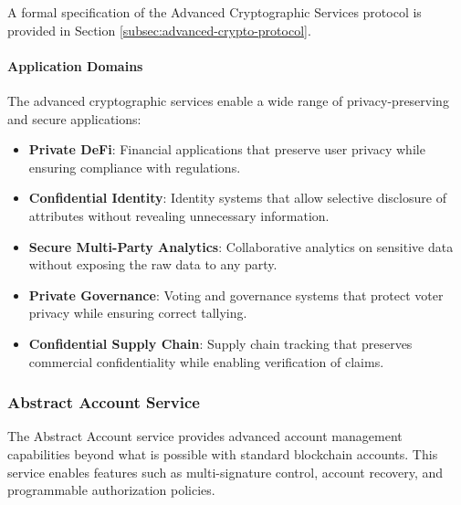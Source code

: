 A formal specification of the Advanced Cryptographic Services protocol is provided in Section \ref{subsec:advanced-crypto-protocol}.



\paragraph{Application Domains}
The advanced cryptographic services enable a wide range of privacy-preserving and secure applications:

\begin{itemize}
    \item \textbf{Private DeFi}: Financial applications that preserve user privacy while ensuring compliance with regulations.
    
    \item \textbf{Confidential Identity}: Identity systems that allow selective disclosure of attributes without revealing unnecessary information.
    
    \item \textbf{Secure Multi-Party Analytics}: Collaborative analytics on sensitive data without exposing the raw data to any party.
    
    \item \textbf{Private Governance}: Voting and governance systems that protect voter privacy while ensuring correct tallying.
    
    \item \textbf{Confidential Supply Chain}: Supply chain tracking that preserves commercial confidentiality while enabling verification of claims.
\end{itemize}

\subsubsection{Abstract Account Service}
\label{subsubsec:abstract-account}

The Abstract Account service provides advanced account management capabilities beyond what is possible with standard blockchain accounts. This service enables features such as multi-signature control, account recovery, and programmable authorization policies.



